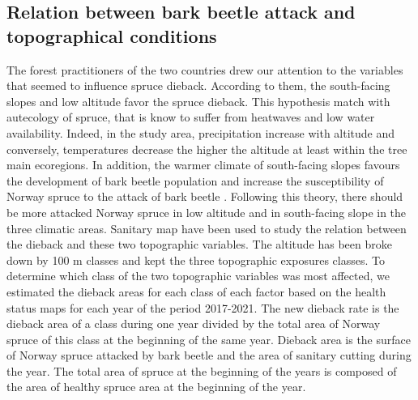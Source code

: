 \documentclass[3p,procedia]{elsarticle}
\begin{document}
\subsection{Relation between bark beetle attack and topographical conditions}




The forest practitioners of the two countries drew our attention to the variables that seemed to influence spruce dieback.
According to them, the south-facing slopes and low altitude favor the spruce dieback.
This hypothesis match with autecology of spruce, that is know to suffer from heatwaves and low water availability.
Indeed, in the study area, precipitation increase with altitude and conversely, temperatures decrease the higher the altitude at least within the tree main ecoregions.
In addition, the warmer climate of south-facing slopes favours the development of bark beetle population \citep{annila_influence_1969, baier_phenipscomprehensive_2007, jonsson_2009, marini_climate_2012} and increase the susceptibility of Norway spruce to the attack of bark beetle \citep{wermelinger_ecology_2004, netherer_waterlimiting_2015}.
Following this theory, there should be more attacked Norway spruce in low altitude and in south-facing slope in the three climatic areas.  
Sanitary map have been used to study the relation between the dieback and these two topographic variables.
The altitude has been broke down  by 100 m classes and kept the three topographic exposures classes.
To determine which class of the two topographic variables was most affected, we estimated the dieback areas for each class of each factor based on the health status maps for each year of the period 2017-2021.
The  new dieback rate is  the dieback area of a class during one year divided by the total area of Norway spruce of this class at the beginning of the same year. 
Dieback area is the surface of Norway spruce attacked by bark beetle and the area of sanitary cutting during the year. 
The total area of spruce at the beginning of the years is composed of the area of healthy spruce area at the beginning of the year. 
\end{document}
